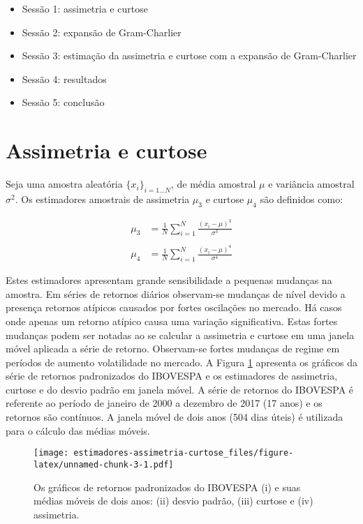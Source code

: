 \documentclass[]{article}
\providecommand{\tightlist}{%
  \setlength{\itemsep}{0pt}\setlength{\parskip}{0pt}}
\begin{document}
\begin{itemize}
\tightlist
\item
  Sessão 1: assimetria e curtose
\item
  Sessão 2: expansão de Gram-Charlier
\item
  Sessão 3: estimação da assimetria e curtose com a expansão de
  Gram-Charlier
\item
  Sessão 4: resultados
\item
  Sessão 5: conclusão
\end{itemize}

\section{Assimetria e curtose}\label{assimetria-e-curtose}

Seja uma amostra aleatória \(\{x_i\}_{i=1...N}\), de média amostral
\(\mu\) e variância amostral \(\sigma^2\). Os estimadores amostrais de
assimetria \(\mu_3\) e curtose \(\mu_4\) são definidos como:

\[
\begin{split}
\mu_3 & = \frac{1}{N} \sum_{i=1}^{N} \frac{(x_i - \mu)^3}{\sigma^3} \\ \\
\mu_4 & = \frac{1}{N} \sum_{i=1}^{N} \frac{(x_i - \mu)^4}{\sigma^4}
\end{split}
\]

Estes estimadores apresentam grande sensibilidade a pequenas mudanças na
amostra. Em séries de retornos diários observam-se mudanças de nível
devido a presença retornos atípicos causados por fortes oscilações no
mercado. Há casos onde apenas um retorno atípico causa uma variação
significativa. Estas fortes mudanças podem ser notadas ao se calcular a
assimetria e curtose em uma janela móvel aplicada a série de retorno.
Observam-se fortes mudanças de regime em períodos de aumento
volatilidade no mercado. A Figura \ref{fig:skewness-kurtosis-ma}
apresenta os gráficos da série de retornos padronizados do IBOVESPA e os
estimadores de assimetria, curtose e do desvio padrão em janela móvel. A
série de retornos do IBOVESPA é referente ao período de janeiro de 2000
a dezembro de 2017 (17 anos) e os retornos são contínuos. A janela móvel
de dois anos (504 dias úteis) é utilizada para o cálculo das médias
móveis.

\begin{figure}
\centering
\texttt{[image: estimadores-assimetria-curtose\_files/figure-latex/unnamed-chunk-3-1.pdf]}
\caption{\label{fig:skewness-kurtosis-ma} Os gráficos de retornos
padronizados do IBOVESPA (i) e suas médias móveis de dois anos: (ii)
desvio padrão, (iii) curtose e (iv) assimetria.}
\end{figure}
\end{document}
